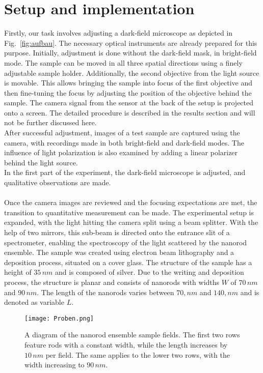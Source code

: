 \section{\label{sec:aufbau}Setup and implementation}
Firstly, our task involves adjusting a dark-field microscope as depicted in Fig.~\ref{fig:aufbau}. 
The necessary optical instruments are already prepared for this purpose. 
Initially, adjustment is done without the dark-field mask, in bright-field mode. 
The sample can be moved in all three spatial directions using a finely adjustable sample holder. 
Additionally, the second objective from the light source is movable. 
This allows bringing the sample into focus of the first objective and then fine-tuning 
the focus by adjusting the position of the objective behind the sample. 
The camera signal from the sensor at the back of the setup is projected onto a screen. 
The detailed procedure is described in the results section and will not be further discussed here. \\
After successful adjustment, images of a test sample are captured using the camera, with recordings 
made in both bright-field and dark-field modes. 
The influence of light polarization is also examined by adding a linear polarizer behind the light source. \\
In the first part of the experiment, the dark-field microscope is adjusted, and qualitative observations are made. \\ \\
Once the camera images are reviewed and the focusing expectations are met, 
the transition to quantitative measurement can be made. 
The experimental setup is expanded, with the light hitting the camera split using a beam splitter. 
With the help of two mirrors, this sub-beam is directed onto the entrance slit of a spectrometer, 
enabling the spectroscopy of the light scattered by the nanorod ensemble. 
The sample was created using electron beam lithography and a deposition process, 
situated on a cover glass. 
The structure of the sample has a height of $35\,\si{nm}$ and is composed of silver. 
Due to the writing and deposition process, the structure is planar and consists of nanorods with 
widths $W$ of $70\,\si{nm}$ and $90\,\si{nm}$. 
The length of the nanorods varies between $70,\si{nm}$ and $140,\si{nm}$ and is denoted as variable $L$. \\
\begin{figure}[h!]
    \centering
    \texttt{[image: Proben.png]}
    \caption{\label{fig:proben}A diagram of the nanorod ensemble sample fields. 
    The first two rows feature rods with a constant width, while the length increases by $10\,\si{nm}$ per field. 
    The same applies to the lower two rows, with the width increasing to $90\,\si{nm}$.}
\end{figure} \FloatBarrier
